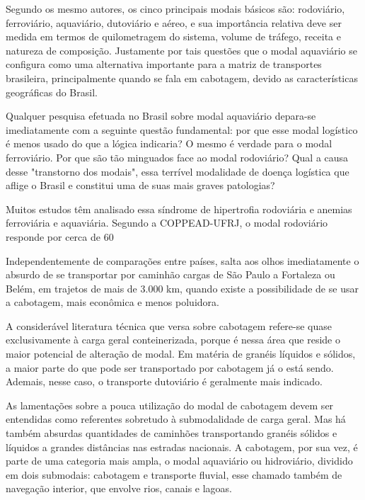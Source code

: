 Segundo os mesmo autores, os cinco principais modais básicos são: rodoviário, ferroviário, aquaviário, dutoviário e aéreo, e sua importância relativa deve ser medida em termos de quilometragem do sistema, volume de tráfego, receita e natureza de composição. Justamente por tais questões que o modal aquaviário se configura como uma alternativa importante para a matriz de transportes brasileira, principalmente quando se fala em cabotagem, devido as características geográficas do Brasil.

Qualquer pesquisa efetuada no Brasil sobre modal aquaviário depara-se imediatamente com a seguinte questão fundamental: por que esse modal logístico é menos usado do que a lógica indicaria? O mesmo é verdade para o modal ferroviário. Por que são tão minguados face ao modal rodoviário? Qual a causa desse "transtorno dos modais", essa terrível modalidade de doença logística que aflige o Brasil e constitui uma de suas mais graves patologias?

Muitos estudos têm analisado essa síndrome de hipertrofia rodoviária e anemias ferroviária e aquaviária. Segundo a COPPEAD-UFRJ, o modal rodoviário responde por cerca de 60%

Independentemente de comparações entre países, salta aos olhos imediatamente o absurdo de se transportar por caminhão cargas de São Paulo a Fortaleza ou Belém, em trajetos de mais de 3.000 km, quando existe a possibilidade de se usar a cabotagem, mais econômica e menos poluidora.

A considerável literatura técnica que versa sobre cabotagem refere-se quase exclusivamente à carga geral conteinerizada, porque é nessa área que reside o maior potencial de alteração de modal. Em matéria de granéis líquidos e sólidos, a maior parte do que pode ser transportado por cabotagem já o está sendo. Ademais, nesse caso, o transporte dutoviário é geralmente mais indicado.

As lamentações sobre a pouca utilização do modal de cabotagem devem ser entendidas como referentes sobretudo à submodalidade de carga geral. Mas há também absurdas quantidades de caminhões transportando granéis sólidos e líquidos a grandes distâncias nas estradas nacionais. A cabotagem, por sua vez, é parte de uma categoria mais ampla, o modal aquaviário ou hidroviário, dividido em dois submodais: cabotagem e transporte fluvial, esse chamado também de navegação interior, que envolve rios, canais e lagoas.


